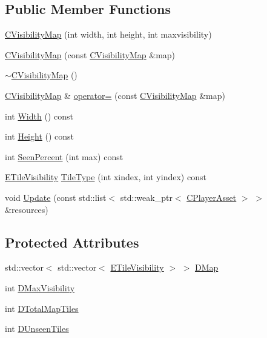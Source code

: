 \subsection*{Public Member Functions}
\begin{DoxyCompactItemize}
\item 
\hyperlink{classCVisibilityMap_aa5f898269a92cc63487ccca7d4c4de04}{C\+Visibility\+Map} (int width, int height, int maxvisibility)
\item 
\hyperlink{classCVisibilityMap_ad0a772b55a6ca65d2038a3d9a2f5c945}{C\+Visibility\+Map} (const \hyperlink{classCVisibilityMap}{C\+Visibility\+Map} \&map)
\item 
\hyperlink{classCVisibilityMap_abaf8bf7d8db8877d51e5691de87ef672}{$\sim$\+C\+Visibility\+Map} ()
\item 
\hyperlink{classCVisibilityMap}{C\+Visibility\+Map} \& \hyperlink{classCVisibilityMap_a704cb26f12821ba012619ca1ae164ab5}{operator=} (const \hyperlink{classCVisibilityMap}{C\+Visibility\+Map} \&map)
\item 
int \hyperlink{classCVisibilityMap_ae916b942ca0d25d93eb8ecde5f08aef3}{Width} () const
\item 
int \hyperlink{classCVisibilityMap_a19c9135268d93be11a13e108a87414ea}{Height} () const
\item 
int \hyperlink{classCVisibilityMap_a1474250aca17378ff10f12b652bdc34a}{Seen\+Percent} (int max) const
\item 
\hyperlink{classCVisibilityMap_a6665f905da08825adbb0eee7bd1f2f30}{E\+Tile\+Visibility} \hyperlink{classCVisibilityMap_a8517fe52114dd469093fd1bd13482733}{Tile\+Type} (int xindex, int yindex) const
\item 
void \hyperlink{classCVisibilityMap_a5ca9902ef0bc2714617719800e20aa19}{Update} (const std\+::list$<$ std\+::weak\+\_\+ptr$<$ \hyperlink{classCPlayerAsset}{C\+Player\+Asset} $>$ $>$ \&resources)
\end{DoxyCompactItemize}
\subsection*{Protected Attributes}
\begin{DoxyCompactItemize}
\item 
std\+::vector$<$ std\+::vector$<$ \hyperlink{classCVisibilityMap_a6665f905da08825adbb0eee7bd1f2f30}{E\+Tile\+Visibility} $>$ $>$ \hyperlink{classCVisibilityMap_ad217bc34f7a50dd357a3eeeb69cfdd85}{D\+Map}
\item 
int \hyperlink{classCVisibilityMap_ac8f71b9541c903fce0294d75daa1bbb1}{D\+Max\+Visibility}
\item 
int \hyperlink{classCVisibilityMap_a9bd6e633268535677aeefbd886c29485}{D\+Total\+Map\+Tiles}
\item 
int \hyperlink{classCVisibilityMap_a117ff39fef73ffd4cc4ba35c35e63171}{D\+Unseen\+Tiles}
\end{DoxyCompactItemize}


